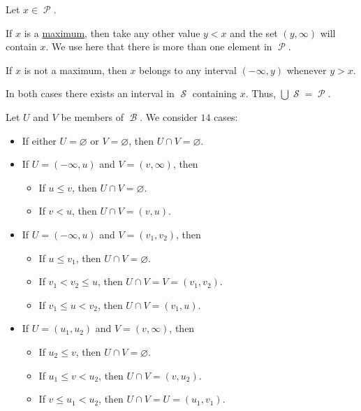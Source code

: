 \begin{defproof}
   Let \( x \in \mscrP \).

  If \( x \) is a \hyperref[def:partially_ordered_set_extremal_points/maximum_and_minimum]{maximum}, then take any other value \( y < x \) and the set \( (y, \infty) \) will contain \( x \). We use here that there is more than one element in \( \mscrP \).

  If \( x \) is not a maximum, then \( x \) belongs to any interval \( (-\infty, y) \) whenever \( y > x \).

  In both cases there exists an interval in \( \mscrS \) containing \( x \). Thus, \( \bigcup \mscrS = \mscrP \).

   Let \( U \) and \( V \) be members of \( \mscrB \). We consider \( 14 \) cases:
  \begin{itemize}
    \item If either \( U = \varnothing \) or \( V = \varnothing \), then \( U \cap V = \varnothing \).
    \item If \( U = (-\infty, u) \) and \( V = (v, \infty) \), then
    \begin{itemize}
      \item If \( u \leq v \), then \( U \cap V = \varnothing \).
      \item If \( v < u \), then \( U \cap V = (v, u) \).
    \end{itemize}

    \item If \( U = (-\infty, u) \) and \( V = (v_1, v_2) \), then
    \begin{itemize}
      \item If \( u \leq v_1 \), then \( U \cap V = \varnothing \).
      \item If \( v_1 < v_2 \leq u \), then \( U \cap V = V =  (v_1, v_2) \).
      \item If \( v_1 \leq u < v_2 \), then \( U \cap V = (v_1, u) \).
    \end{itemize}

    \item If \( U = (u_1, u_2) \) and \( V = (v, \infty) \), then
    \begin{itemize}
      \item If \( u_2 \leq v \), then \( U \cap V = \varnothing \).
      \item If \( u_1 \leq v < u_2 \), then \( U \cap V = (v, u_2) \).
      \item If \( v \leq u_1 < u_2 \), then \( U \cap V = U = (u_1, v_1) \).
    \end{itemize}


\end{itemize}
\end{defproof}

